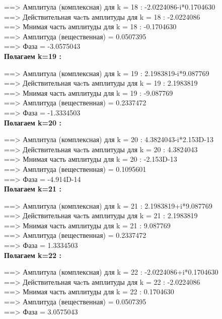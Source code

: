 \documentclass[a4paper,11pt]{article}
\begin{document}
\begin{flushleft}
 ==> Амплитула (комплексная) для k = 18 : -2.0224086-i*0.1704630\\ 
 ==> Действительная чаcть амплитуды  для k = 18 : -2.0224086\\ 
 ==> Мнимая часть амплитуды  для k = 18 : -0.1704630\\ 
 ==> Амплитуда (вещественная) = 0.0507395\\ 
 ==> Фаза = -3.0575043\\ 
\textbf{Полагаем k=19 :\\} 

 ==> Амплитула (комплексная) для k = 19 :  2.1983819-i*9.087769\\ 
 ==> Действительная чаcть амплитуды  для k = 19 : 2.1983819\\ 
 ==> Мнимая часть амплитуды  для k = 19 : -9.087769\\ 
 ==> Амплитуда (вещественная) = 0.2337472\\ 
 ==> Фаза = -1.3334503\\ 
\textbf{Полагаем k=20 :\\} 

 ==> Амплитула (комплексная) для k = 20 :  4.3824043-i*2.153D-13\\ 
 ==> Действительная чаcть амплитуды  для k = 20 : 4.3824043\\ 
 ==> Мнимая часть амплитуды  для k = 20 : -2.153D-13\\ 
 ==> Амплитуда (вещественная) = 0.1095601\\ 
 ==> Фаза = -4.914D-14\\ 

\textbf{Полагаем k=21 :\\ }

 ==> Амплитула (комплексная) для k = 21 :  2.1983819+i*9.087769\\ 
 ==> Действительная чаcть амплитуды  для k = 21 : 2.1983819\\ 
 ==> Мнимая часть амплитуды  для k = 21 : 9.087769\\ 
 ==> Амплитуда (вещественная) = 0.2337472\\ 
 ==> Фаза = 1.3334503\\ 

\textbf{Полагаем k=22 :\\} 

 ==> Амплитула (комплексная) для k = 22 : -2.0224086+i*0.1704630\\ 
 ==> Действительная чаcть амплитуды  для k = 22 : -2.0224086\\ 
 ==> Мнимая часть амплитуды  для k = 22 : 0.1704630\\ 
 ==> Амплитуда (вещественная) = 0.0507395\\ 
 ==> Фаза = 3.0575043\\ 


\end{flushleft}
\end{document}
